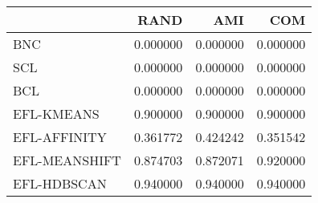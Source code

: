 \begin{tabular}{lrrr}
\toprule
 & RAND & AMI & COM \\
\midrule
BNC & 0.000000 & 0.000000 & 0.000000 \\
SCL & 0.000000 & 0.000000 & 0.000000 \\
BCL & 0.000000 & 0.000000 & 0.000000 \\
EFL-KMEANS & 0.900000 & 0.900000 & 0.900000 \\
EFL-AFFINITY & 0.361772 & 0.424242 & 0.351542 \\
EFL-MEANSHIFT & 0.874703 & 0.872071 & 0.920000 \\
EFL-HDBSCAN & 0.940000 & 0.940000 & 0.940000 \\
\bottomrule
\end{tabular}
